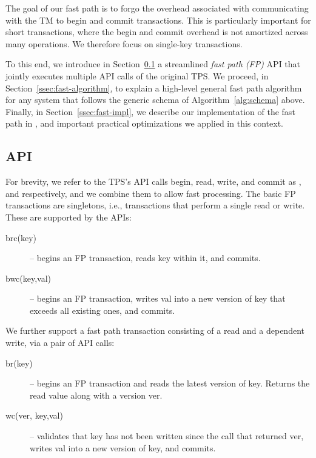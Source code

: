 
The goal of our fast path is to forgo the overhead associated with 
communicating with 
the TM to begin and commit transactions. This is particularly important for short transactions, where the begin and commit overhead is not amortized
across many operations.
We therefore focus on single-key transactions.

To this end, we introduce in Section~\ref{ssec:fast-api} a streamlined  \emph{fast path (FP)}
API that jointly executes multiple API calls of the original TPS.
We proceed, in Section~\ref{ssec:fast-algorithm}, to explain a high-level general fast path algorithm 
{for any system that follows the generic schema of  Algorithm~\ref{alg:schema} above}. 
Finally, in Section~\ref{ssec:fast-impl}, we describe our implementation of the fast path in \sys, and 
important practical optimizations we applied in this context.
 
\subsection{API}
\label{ssec:fast-api}

For brevity, we refer to the TPS's API calls  begin, read, write, and commit as , and  respectively, and 
we combine them to allow fast processing.
The basic FP transactions are singletons, i.e., transactions that perform a single
read or write. These are supported by the APIs: 
\begin{description}
\item[brc(key)] -- begins an FP transaction, reads key within it, and commits.
\item[bwc(key,val)] -- begins an FP transaction,  writes val into a new version of key that exceeds all existing ones, and commits.
\end{description}

We further support a fast path transaction consisting of a read and a dependent write, via a pair of API calls:
\begin{description}
\item[br(key)] -- begins an FP transaction and  reads the latest version of key. 
Returns the read value along with a version ver.
\item[wc(ver, key,val)] -- 	validates that key has not been written since the   call that returned ver, writes val into a new version of key, and commits.
\end{description}

